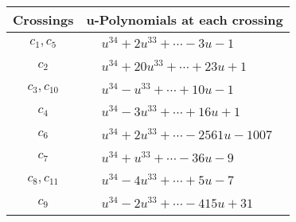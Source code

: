 \documentclass[1p]{elsarticle_modified}
\theoremstyle{definition}
\begin{document}
\begin{tabular}{m{50pt}|m{274pt}}
Crossings & \hspace{64pt}u-Polynomials at each crossing \\
\hline $$\begin{aligned}c_{1},c_{5}\end{aligned}$$&$\begin{aligned}
&u^{34}+2 u^{33}+\cdots-3 u-1
\end{aligned}$\\
\hline $$\begin{aligned}c_{2}\end{aligned}$$&$\begin{aligned}
&u^{34}+20 u^{33}+\cdots+23 u+1
\end{aligned}$\\
\hline $$\begin{aligned}c_{3},c_{10}\end{aligned}$$&$\begin{aligned}
&u^{34}- u^{33}+\cdots+10 u-1
\end{aligned}$\\
\hline $$\begin{aligned}c_{4}\end{aligned}$$&$\begin{aligned}
&u^{34}-3 u^{33}+\cdots+16 u+1
\end{aligned}$\\
\hline $$\begin{aligned}c_{6}\end{aligned}$$&$\begin{aligned}
&u^{34}+2 u^{33}+\cdots-2561 u-1007
\end{aligned}$\\
\hline $$\begin{aligned}c_{7}\end{aligned}$$&$\begin{aligned}
&u^{34}+u^{33}+\cdots-36 u-9
\end{aligned}$\\
\hline $$\begin{aligned}c_{8},c_{11}\end{aligned}$$&$\begin{aligned}
&u^{34}-4 u^{33}+\cdots+5 u-7
\end{aligned}$\\
\hline $$\begin{aligned}c_{9}\end{aligned}$$&$\begin{aligned}
&u^{34}-2 u^{33}+\cdots-415 u+31
\end{aligned}$\\
\hline
\end{tabular}\\~\\
\end{document}

